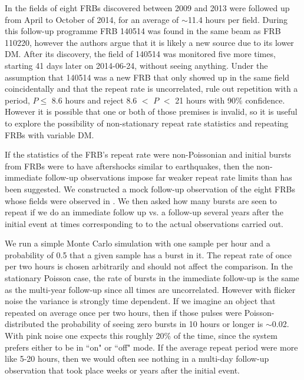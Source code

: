\documentclass[useAMS,usenatbib]{mn2e}
\begin{document}
In \citep{2015MNRAS.454..457P}
the fields of eight FRBs discovered between 2009 and 2013
were followed up from April to October of 2014, for an average 
of $\sim$11.4 hours per field. During this follow-up programme 
FRB 140514 was found in the same beam as FRB 110220, however
the authors argue that it is likely a new source due to its lower DM. 
After its discovery, the field of 140514 was monitored 
five more times, starting 41 days later on 2014-06-24, without seeing anything.
Under the assumption that 140514 was a new FRB 
that only showed up in the same field 
coincidentally and that the repeat rate is uncorrelated,
 \cite{2015MNRAS.454..457P} rule out repetition with a period, $P \le$ 8.6 
hours and reject 8.6 $<$ $P$ $<$ 21 hours with 90$\%$ confidence.
However it is possible that one or both of those premises 
is invalid, so it is useful to explore the possibility of non-stationary 
repeat rate statistics and repeating FRBs with variable DM. 

If the statistics of the FRB's repeat rate were
non-Poissonian and initial bursts from FRBs were to have aftershocks
similar to earthquakes, then the non-immediate follow-up observations 
impose far weaker repeat rate limits than has been suggested. We 
constructed a mock follow-up observation of the eight FRBs whose
fields were observed in \citep{2015MNRAS.454..457P}. We then 
asked how many bursts are seen to repeat if we do an immediate
follow up vs. a follow-up several years after the initial event 
at times corresponding to 
to the actual observations carried out. 

We run a simple Monte Carlo 
simulation with one sample per hour and a probability of 0.5 
that a given sample has a burst in it. The repeat rate of once per two hours
is chosen arbitrarily and should not affect the comparison. 
In the stationary Poisson case, the rate of bursts in 
the immediate follow-up is the same as the multi-year follow-up 
since all times are 
uncorrelated. However with flicker noise 
the variance is strongly time dependent. If we imagine an object that 
repeated on average once per two hours, then if those pulses were Poisson-distributed 
the probability of seeing zero bursts in 10 hours or longer is $\sim$0.02. With 
pink noise one expects this roughly 20$\%$ of the time, since the system 
prefers either to be in ``on" or ``off" mode. If the average repeat period were more 
like 5-20 hours, then we would often see nothing in a multi-day follow-up 
observation that took place weeks or years after the initial event.
\end{document}

